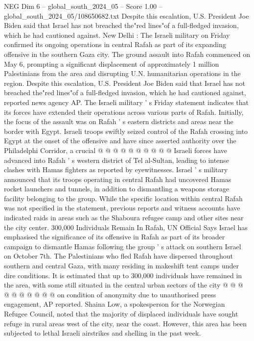 \begin{textsample}{NEG Dim 6 – global\_south\_2024\_05 – Score 1.00 – global\_south\_2024\_05/108650682.txt}  \label{ex:f6_neg_289}
Despite this escalation, U.S.
President Joe Biden said that Israel has not breached the"red lines"of a full-fledged invasion, which he had cautioned against.
New Delhi : The Israeli military on Friday confirmed its ongoing operations in central Rafah as part of its expanding offensive in the southern Gaza city.
The ground assault into Rafah commenced on May 6, prompting a significant displacement of approximately 1 million Palestinians from the area and disrupting U.N. humanitarian operations in the region.
Despite this escalation, U.S.
President Joe Biden said that Israel has not breached the"red lines"of a full-fledged invasion, which he had cautioned against, reported news agency AP.
The Israeli military ' s Friday statement indicates that its forces have extended their operations across various parts of Rafah.
Initially, the focus of the assault was on Rafah ' s eastern districts and areas near the border with Egypt.
Israeli troops swiftly seized control of the Rafah crossing into Egypt at the onset of the offensive and have since asserted authority over the Philadelphi Corridor, a crucial @ @ @ @ @ @ @ @ @ @ Israeli forces have advanced into Rafah ' s western district of Tel al-Sultan, leading to intense clashes with Hamas fighters as reported by eyewitnesses.
Israel ' s military announced that its troops operating in central Rafah had uncovered Hamas rocket launchers and tunnels, in addition to dismantling a weapons storage facility belonging to the group.
While the specific location within central Rafah was not specified in the statement, previous reports and witness accounts have indicated raids in areas such as the Shaboura refugee camp and other sites near the city center. 300,000 Individuals Remain In Rafah, UN Official Says Israel has emphasised the significance of its offensive in Rafah as part of its broader campaign to dismantle Hamas following the group ' s attack on southern Israel on October 7th.
The Palestinians who fled Rafah have dispersed throughout southern and central Gaza, with many residing in makeshift tent camps under dire conditions.
It is estimated that up to 300,000 individuals have remained in the area, with some still situated in the central urban sectors of the city @ @ @ @ @ @ @ @ @ @ on condition of anonymity due to unauthorised press engagement, AP reported.
Shaina Low, a spokesperson for the Norwegian Refugee Council, noted that the majority of displaced individuals have sought refuge in rural areas west of the city, near the coast.
However, this area has been subjected to lethal Israeli airstrikes and shelling in the past week.

\end{textsample}
